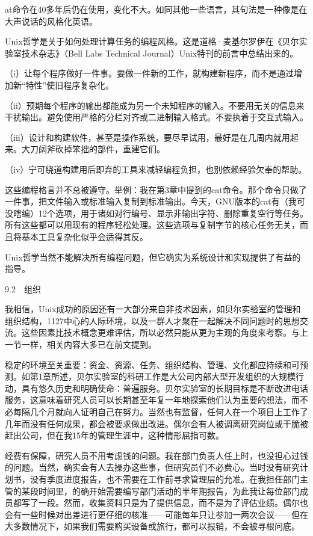 \documentclass[a4paper,12pt,UTF8,twoside]{ctexbook}
\begin{document}
at命令在40多年后仍在使用，变化不大。如同其他一些语言，其句法是一种像是在大声说话的风格化英语。

Unix哲学是关于如何处理计算任务的编程风格。这是道格·麦基尔罗伊在《贝尔实验室技术杂志》（Bell Labs Technical Journal）Unix特刊的前言中总结出来的。

（i）让每个程序做好一件事。要做一件新的工作，就构建新程序，而不是通过增加新“特性”使旧程序复杂化。

（ii）预期每个程序的输出都能成为另一个未知程序的输入。不要用无关的信息来干扰输出。避免使用严格的分栏对齐或二进制输入格式。不要执着于交互式输入。

（iii）设计和构建软件，甚至是操作系统，要尽早试用，最好是在几周内就用起来。大刀阔斧砍掉笨拙的部件，重建它们。

（iv）宁可绕道构建用后即弃的工具来减轻编程负担，也别依赖经验欠奉的帮助。

这些编程格言并不总被遵守。举例：我在第3章中提到的cat命令。那个命令只做了一件事，把文件输入或标准输入复制到标准输出。今天，GNU版本的cat有（我可没瞎编）12个选项，用于诸如对行编号、显示非输出字符、删除重复空行等任务。所有这些都可以用现有的程序轻松处理。这些选项与复制字节的核心任务无关，而且将基本工具复杂化似乎会适得其反。

Unix哲学当然不能解决所有编程问题，但它确实为系统设计和实现提供了有益的指导。





9.2　组织


我相信，Unix成功的原因还有一大部分来自非技术因素，如贝尔实验室的管理和组织结构，1127中心的人际环境，以及一群人才聚在一起解决不同问题时的思想交流。这些因素比技术概念更难评估，所以必然只能从更为主观的角度来考察。与上一节一样，相关内容大多已在前文提到。

稳定的环境至关重要：资金、资源、任务、组织结构、管理、文化都应持续和可预测。如第1章所述，贝尔实验室的科研工作是大公司内部大型开发组织的大规模行动，具有悠久历史和明确使命：普遍服务。贝尔实验室的长期目标是不断改进电话服务，这意味着研究人员可以长期甚至年复一年地探索他们认为重要的想法，而不必每隔几个月就向人证明自己在努力。当然也有监督，任何人在一个项目上工作了几年而没有任何成果，都会被要求做出改进。偶尔会有人被调离研究岗位或干脆被赶出公司，但在我15年的管理生涯中，这种情形屈指可数。

经费有保障，研究人员不用考虑钱的问题。我在部门负责人任上时，也没担心过钱的问题。当然，确实会有人去操办这些事，但研究员们不必费心。当时没有研究计划书，没有季度进度报告，也不需要在工作前寻求管理层的允准。在我担任部门主管的某段时间里，的确开始需要编写部门活动的半年期报告，为此我让每位部门成员都写了一段。然而，收集资料只是为了提供信息，而不是为了评估业绩。偶尔也会有一些时候对出差进行更仔细的核准——可能每年只让参加一两次会议——但在大多数情况下，如果我们需要购买设备或旅行，都可以报销，不会被寻根问底。
\end{document}
